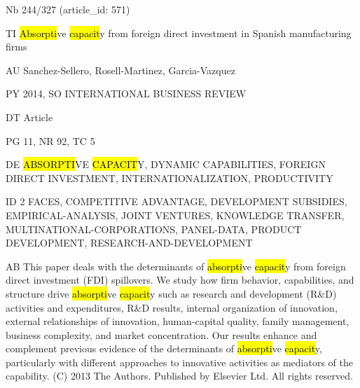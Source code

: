 \documentclass[a4paper]{article}
\begin{document}
\vspace*{-2cm}
Nb \tabto{0cm}244/327 (article\_id: 571)\par
TI \tabto{0cm}\hl{Absorpti}ve \hl{capacit}y from foreign direct investment in Spanish manufacturing firms\par
AU \tabto{0cm}Sanchez-Sellero, Rosell-Martinez, Garcia-Vazquez\par
PY \tabto{0cm}2014, SO INTERNATIONAL BUSINESS REVIEW\par
DT \tabto{0cm}Article\par
PG \tabto{0cm}11, NR 92, TC 5\par
DE \tabto{0cm}\hl{ABSORPTI}VE \hl{CAPACIT}Y, DYNAMIC CAPABILITIES, FOREIGN DIRECT INVESTMENT, INTERNATIONALIZATION, PRODUCTIVITY\par
ID \tabto{0cm}2 FACES, COMPETITIVE ADVANTAGE, DEVELOPMENT SUBSIDIES, EMPIRICAL-ANALYSIS, JOINT VENTURES, KNOWLEDGE TRANSFER, MULTINATIONAL-CORPORATIONS, PANEL-DATA, PRODUCT DEVELOPMENT, RESEARCH-AND-DEVELOPMENT\par
AB \tabto{0cm}This paper deals with the determinants of \hl{absorpti}ve \hl{capacit}y from foreign direct investment (FDI) spillovers. We study how firm behavior, capabilities, and structure drive \hl{absorpti}ve \hl{capacit}y such as research and development (R\&D) activities and expenditures, R\&D results, internal organization of innovation, external relationships of innovation, human-capital quality, family management, business complexity, and market concentration. Our results enhance and complement previous evidence of the determinants of \hl{absorpti}ve \hl{capacit}y, particularly with different approaches to innovative activities as mediators of the capability. (C) 2013 The Authors. Published by Elsevier Ltd. All rights reserved.\par
\clearpage
\end{document}
